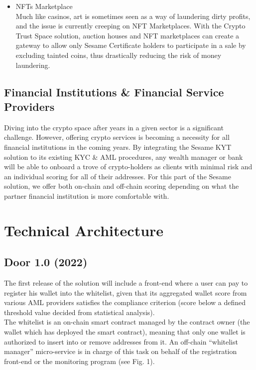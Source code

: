 ﻿\documentclass[a4paper]{article}
\newcommand{\smallvspace}{\vspace{4pt} \\}
\begin{document}
\begin{itemize}
\item 
NFTs Marketplace \smallvspace
Much like casinos, art is sometimes seen as a way of laundering dirty profits, and the issue is currently creeping on NFT Marketplaces. With the Crypto Trust Space solution, auction houses and NFT marketplaces can create a gateway to allow only Sesame Certificate holders to participate in a sale by excluding tainted coins, thus drastically reducing the risk of money laundering.
\end{itemize}

\subsection{Financial Institutions \& Financial Service Providers}
Diving into the crypto space after years in a given sector is a significant challenge. However, offering crypto services is becoming a necessity for all financial institutions in the coming years. By integrating the Sesame KYT solution to its existing KYC \& AML procedures, any wealth manager or bank will be able to onboard a trove of crypto-holders as clients with minimal risk and an individual scoring for all of their addresses. 
For this part of the Sesame solution, we offer both on-chain and off-chain scoring depending on what the partner financial institution is more comfortable with.

\newpage
\section{Technical Architecture}
\subsection{Door 1.0 (2022)}
The first release of the solution will include a front-end where a user can pay to register his wallet into the whitelist, given that its aggregated wallet score from various AML providers satisfies the compliance criterion (score below a defined threshold value decided from statistical analysis). \\

The whitelist is an on-chain smart contract managed by the contract owner (the wallet which has deployed the smart contract), meaning that only one wallet is authorized to insert into or remove addresses from it. An off-chain “whitelist manager” micro-service is in charge of this task on behalf of the registration front-end or the monitoring program (see Fig. 1). \\
\end{document}
